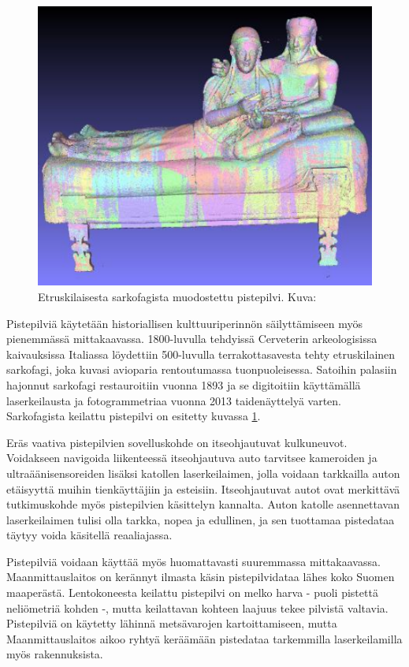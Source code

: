 \begin{figure}
    \centering
    \includegraphics[width=0.4\paperwidth]{img/sarkofagi.png}
    \caption{Etruskilaisesta sarkofagista muodostettu pistepilvi. Kuva: \cite{sarkofagi}}
    \label{sarko}
\end{figure}

Pistepilviä käytetään historiallisen kulttuuriperinnön säilyttämiseen myös pienemmässä mittakaavassa. 1800-luvulla tehdyissä Cerveterin arkeologisissa kaivauksissa Italiassa löydettiin 500-luvulla terrakottasavesta tehty etruskilainen sarkofagi, joka kuvasi avioparia rentoutumassa tuonpuoleisessa. Satoihin palasiin hajonnut sarkofagi restauroitiin vuonna 1893 ja se digitoitiin käyttämällä laserkeilausta ja fotogrammetriaa vuonna 2013 taidenäyttelyä varten. Sarkofagista keilattu pistepilvi on esitetty kuvassa \ref{sarko}. \cite{sarkofagi} 

Eräs vaativa pistepilvien sovelluskohde on itseohjautuvat kulkuneuvot. Voidakseen navigoida liikenteessä itseohjautuva auto tarvitsee kameroiden ja ultraäänisensoreiden lisäksi katollen laserkeilaimen, jolla voidaan tarkkailla auton etäisyyttä muihin tienkäyttäjiin ja esteisiin. Itseohjautuvat autot ovat merkittävä tutkimuskohde myös pistepilvien käsittelyn kannalta. Auton katolle asennettavan laserkeilaimen tulisi olla tarkka, nopea ja edullinen, ja sen tuottamaa pistedataa täytyy voida käsitellä reaaliajassa. \cite{car} 

Pistepilviä voidaan käyttää myös huomattavasti suuremmassa mittakaavassa. Maanmittauslaitos on kerännyt ilmasta käsin pistepilvidataa lähes koko Suomen maaperästä. Lentokoneesta keilattu pistepilvi on melko harva - puoli pistettä neliömetriä kohden -, mutta keilattavan kohteen laajuus tekee pilvistä valtavia. Pistepilviä on käytetty lähinnä metsävarojen kartoittamiseen, mutta Maanmittauslaitos aikoo ryhtyä keräämään pistedataa tarkemmilla laserkeilamilla myös rakennuksista. \cite{hs}

